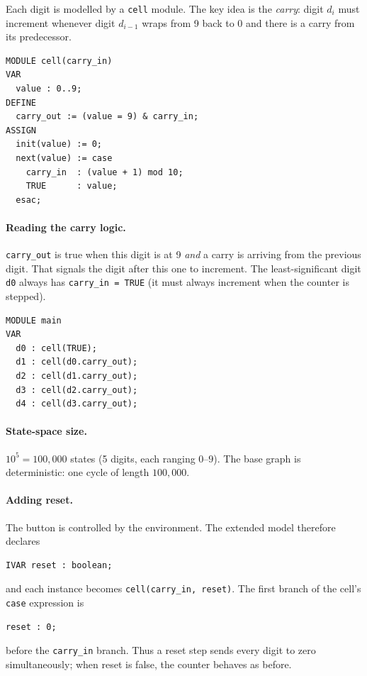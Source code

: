 Each digit is modelled by a \texttt{cell} module.  The key idea is the
\emph{carry}: digit $d_i$ must increment whenever digit $d_{i-1}$ wraps
from 9 back to 0 and there is a carry from its predecessor.

\begin{verbatim}
MODULE cell(carry_in)
VAR
  value : 0..9;
DEFINE
  carry_out := (value = 9) & carry_in;
ASSIGN
  init(value) := 0;
  next(value) := case
    carry_in  : (value + 1) mod 10;
    TRUE      : value;
  esac;
\end{verbatim}

\paragraph{Reading the carry logic.}  \texttt{carry\_out} is true when this
digit is at 9 \emph{and} a carry is arriving from the previous digit.  That
signals the digit after this one to increment.  The least-significant digit
\texttt{d0} always has \texttt{carry\_in = TRUE} (it must always increment
when the counter is stepped).

\begin{verbatim}
MODULE main
VAR
  d0 : cell(TRUE);
  d1 : cell(d0.carry_out);
  d2 : cell(d1.carry_out);
  d3 : cell(d2.carry_out);
  d4 : cell(d3.carry_out);
\end{verbatim}

\paragraph{State-space size.}  $10^5 = 100{,}000$ states (5 digits, each
ranging $0$--$9$).  The base graph is deterministic: one cycle of length
$100{,}000$.

\paragraph{Adding reset.}  The button is controlled by the environment.  The
extended model therefore declares
\begin{verbatim}
IVAR reset : boolean;
\end{verbatim}
and each instance becomes \texttt{cell(carry\_in, reset)}.  The first branch
of the cell's \texttt{case} expression is
\begin{verbatim}
reset : 0;
\end{verbatim}
before the \texttt{carry\_in} branch.  Thus a reset step sends every digit to
zero simultaneously; when reset is false, the counter behaves as before.


